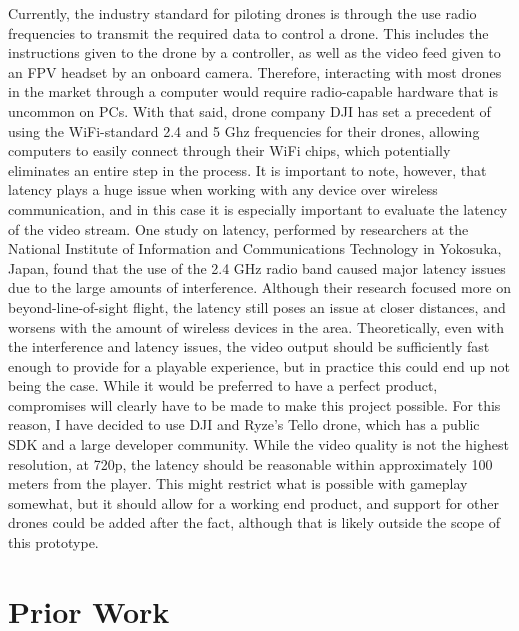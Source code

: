 \documentclass[10pt,twocolumn]{article}
\begin{document}
Currently, the industry standard for piloting drones is through the use radio frequencies to transmit the required data to control a drone. This includes the instructions given to the drone by a controller, as well as the video feed given to an FPV headset by an onboard camera. Therefore, interacting with most drones in the market through a computer would require radio-capable hardware that is uncommon on PCs. With that said, drone company DJI has set a precedent of using the WiFi-standard 2.4 and 5 Ghz frequencies for their drones, allowing computers to easily connect through their WiFi chips, which potentially eliminates an entire step in the process. It is important to note, however, that latency plays a huge issue when working with any device over wireless communication, and in this case it is especially important to evaluate the latency of the video stream. One study on latency\cite{LatencyDroneBLOS}, performed by researchers at the National Institute of Information and Communications Technology in Yokosuka, Japan, found that the use of the 2.4 GHz radio band caused major latency issues due to the large amounts of interference. Although their research focused more on beyond-line-of-sight flight, the latency still poses an issue at closer distances, and worsens with the amount of wireless devices in the area. Theoretically, even with the interference and latency issues, the video output should be sufficiently fast enough to provide for a playable experience, but in practice this could end up not being the case. While it would be preferred to have a perfect product, compromises will clearly have to be made to make this project possible. For this reason, I have decided to use DJI and Ryze's Tello drone, which has a public SDK and a large developer community. While the video quality is not the highest resolution, at 720p, the latency should be reasonable within approximately 100 meters from the player. This might restrict what is possible with gameplay somewhat, but it should allow for a working end product, and support for other drones could be added after the fact, although that is likely outside the scope of this prototype.

\section{Prior Work}
\end{document}
